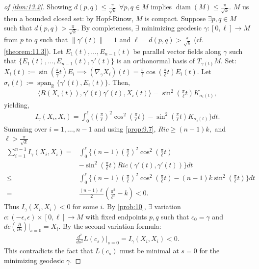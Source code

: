 \begin{proof}[of \autoref{thm:13.2}]
    Showing $d(p,q) \leq \frac{\pi}{\sqrt{k}}$ $\forall p,q \in M$ implies $\operatorname{diam}(M)\leq \frac{\pi}{\sqrt{k}}$.
    $M$ us then a bounded closed set: by Hopf-Rinow, $M$ is compact.
    Suppose $\exists p,q \in M$ such that $d(p,q) > \frac{\pi}{\sqrt{k}}$. By completeness,
    $\exists$ minimizing geodesic $\gamma: [0, \ell] \to M$ from $p$ to $q$ such that 
    $\|\gamma'(t)\|=1$ and $\ell = d(p,q) > \frac{\pi}{\sqrt{k}}$ (cf. \autoref{theorem:11.3}).
    Let $E_1(t), \dots, E_{n-1}(t)$ be parallel vector fields along $\gamma$ such that
    $\{E_1(t), \dots, E_{n-1}(t), \gamma'(t)\}$ is an orthonormal basis of $T_{\gamma(t)}M$.
    Set: $X_i(t):=\sin\left(\frac{\pi}{\gamma}t\right)E_i\implies (\nabla_{\gamma}X_i)(t) = \frac{\pi}{\ell} \cos\left(\frac{\pi}{\ell}t\right)E_i(t)$.
    Let $\sigma_i(t):= \operatorname{span}_{\mathbb{R}}\{\gamma'(t), E_i(t)\}$. Then,
    \[
    \begin{aligned}
        \langle R(X_i(t)), \gamma'(t) \gamma'(t), X_i(t) \rangle = \sin^2\left(\frac{\pi}{\ell}t\right)K_{\sigma_i(t)},
    \end{aligned}
    \]
    yielding,
    \[
    \begin{aligned}
        I_{\gamma}(X_i, X_i) = \int_0^{\ell} \{(\frac{\pi}{\ell})^2 \cos^2(\frac{\pi}{\ell}t)-\sin^2\left(\frac{\pi}{\ell} t\right)K_{\sigma_i(t)} \}dt.
    \end{aligned}
    \]
    Summing over $i=1, \dots, n-1$ and using \autoref{prop:9.7}, $Ric \geq (n-1)k,$ and $\ell > \frac{\pi}{\sqrt{k}}$
    \[
    \begin{aligned}
        \sum_{i=1}^{n-1} I_{\gamma} (X_i, X_i) =& \int_0^{\ell} \{ (n-1)(\frac{\pi}{\ell})^2 \cos^2\left(\frac{\pi}{\ell}t\right)\\
        &-\sin^2\left(\frac{\pi}{\ell}t\right) Ric(\gamma'(t), \gamma'(t))\}dt \\
        \leq& \int_0^{\ell} \{(n-1)\left(\frac{\pi}{\ell}\right)^2 \cos^2\left(\frac{\pi}{\ell} t\right) - (n-1)k \sin^2\left(\frac{\pi}{\ell}t\right)\} dt \\
        =& \frac{(n-1)\ell}{2}\left(\frac{\pi^2}{\ell^2} - k \right) <0.
    \end{aligned}
    \]
    Thus $I_{\gamma}(X_i, X_i) <0$ for some $i$. By \autoref{prob:10}, $\exists$ variation $c:(-\epsilon, \epsilon) \times [0, \ell] \to M$ with fixed endpoints $p,q$ such that
    $c_0 = \gamma$ and $dc(\frac{\partial}{\partial s})|_{s=0} = X_i$.
    By the second variation formula:
    \[
    \begin{aligned}
        \frac{d^2}{ds^2} L(c_s)|_{s=0} = I_{\gamma}(X_i, X_i)<0.
    \end{aligned}
    \]
    This contradicts the fact that $L(c_s)$ must be minimal at $s=0$ for the minimizing geodesic $\gamma$.
\end{proof}